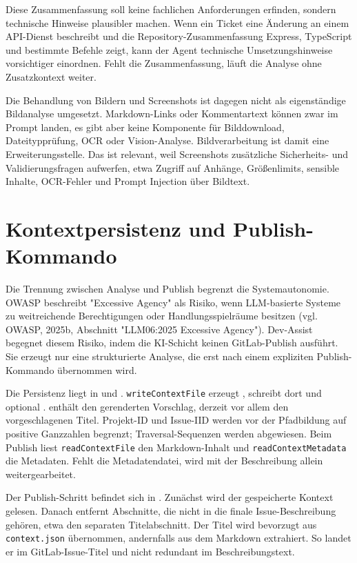 \documentclass[12pt,a4paper,oneside]{scrreprt}
\begin{document}
Diese Zusammenfassung soll keine fachlichen Anforderungen erfinden, sondern technische Hinweise plausibler machen. Wenn ein Ticket eine Änderung an einem API-Dienst beschreibt und die Repository-Zusammenfassung Express, TypeScript und bestimmte Befehle zeigt, kann der Agent technische Umsetzungshinweise vorsichtiger einordnen. Fehlt die Zusammenfassung, läuft die Analyse ohne Zusatzkontext weiter.

Die Behandlung von Bildern und Screenshots ist dagegen nicht als eigenständige Bildanalyse umgesetzt. Markdown-Links oder Kommentartext können zwar im Prompt landen, es gibt aber keine Komponente für Bilddownload, Dateitypprüfung, OCR oder Vision-Analyse. Bildverarbeitung ist damit eine Erweiterungsstelle. Das ist relevant, weil Screenshots zusätzliche Sicherheits- und Validierungsfragen aufwerfen, etwa Zugriff auf Anhänge, Größenlimits, sensible Inhalte, OCR-Fehler und Prompt Injection über Bildtext.

\section{Kontextpersistenz und Publish-Kommando}

Die Trennung zwischen Analyse und Publish begrenzt die Systemautonomie. OWASP beschreibt "Excessive Agency" als Risiko, wenn LLM-basierte Systeme zu weitreichende Berechtigungen oder Handlungsspielräume besitzen (vgl. OWASP, 2025b, Abschnitt "LLM06:2025 Excessive Agency"). Dev-Assist begegnet diesem Risiko, indem die KI-Schicht keinen GitLab-Publish ausführt. Sie erzeugt nur eine strukturierte Analyse, die erst nach einem expliziten Publish-Kommando übernommen wird.

Die Persistenz liegt in  und . \texttt{writeContextFile} erzeugt , schreibt dort  und optional .  enthält den gerenderten Vorschlag,  derzeit vor allem den vorgeschlagenen Titel. Projekt-ID und Issue-IID werden vor der Pfadbildung auf positive Ganzzahlen begrenzt; Traversal-Sequenzen werden abgewiesen. Beim Publish liest \texttt{readContextFile} den Markdown-Inhalt und \texttt{readContextMetadata} die Metadaten. Fehlt die Metadatendatei, wird mit der Beschreibung allein weitergearbeitet.

Der Publish-Schritt befindet sich in . Zunächst wird der gespeicherte Kontext gelesen. Danach entfernt  Abschnitte, die nicht in die finale Issue-Beschreibung gehören, etwa den separaten Titelabschnitt. Der Titel wird bevorzugt aus \texttt{context.json} übernommen, andernfalls aus dem Markdown extrahiert. So landet er im GitLab-Issue-Titel und nicht redundant im Beschreibungstext.
\end{document}
